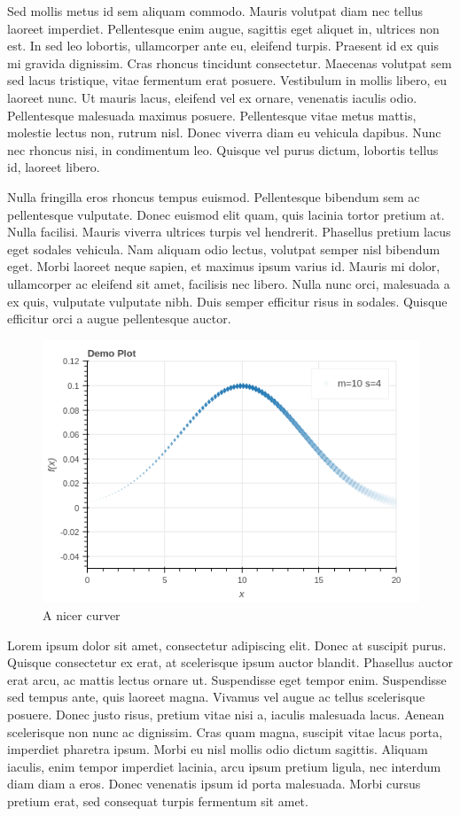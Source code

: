 \documentclass[11pt]{article}
\makeatletter
\def\maxwidth{\ifdim\Gin@nat@width>\linewidth\linewidth
    \else\Gin@nat@width\fi}
\let\Oldincludegraphics\includegraphics
\renewcommand{\includegraphics}[1]{\Oldincludegraphics[width=.8\maxwidth]{#1}}
\makeatother
\begin{document}
Sed mollis metus id sem aliquam commodo. Mauris volutpat diam nec tellus
laoreet imperdiet. Pellentesque enim augue, sagittis eget aliquet in,
ultrices non est. In sed leo lobortis, ullamcorper ante eu, eleifend
turpis. Praesent id ex quis mi gravida dignissim. Cras rhoncus tincidunt
consectetur. Maecenas volutpat sem sed lacus tristique, vitae fermentum
erat posuere. Vestibulum in mollis libero, eu laoreet nunc. Ut mauris
lacus, eleifend vel ex ornare, venenatis iaculis odio. Pellentesque
malesuada maximus posuere. Pellentesque vitae metus mattis, molestie
lectus non, rutrum nisl. Donec viverra diam eu vehicula dapibus. Nunc
nec rhoncus nisi, in condimentum leo. Quisque vel purus dictum, lobortis
tellus id, laoreet libero.

Nulla fringilla eros rhoncus tempus euismod. Pellentesque bibendum sem
ac pellentesque vulputate. Donec euismod elit quam, quis lacinia tortor
pretium at. Nulla facilisi. Mauris viverra ultrices turpis vel
hendrerit. Phasellus pretium lacus eget sodales vehicula. Nam aliquam
odio lectus, volutpat semper nisl bibendum eget. Morbi laoreet neque
sapien, et maximus ipsum varius id. Mauris mi dolor, ullamcorper ac
eleifend sit amet, facilisis nec libero. Nulla nunc orci, malesuada a ex
quis, vulputate vulputate nibh. Duis semper efficitur risus in sodales.
Quisque efficitur orci a augue pellentesque auctor.
       
    \begin{figure}[h!]
      \centering
      \includegraphics{img/nicer.png}
      \caption{A nicer curver}
      \label{fig:nicer}
	\end{figure}

    Lorem ipsum dolor sit amet, consectetur adipiscing elit. Donec at
suscipit purus. Quisque consectetur ex erat, at scelerisque ipsum auctor
blandit. Phasellus auctor erat arcu, ac mattis lectus ornare ut.
Suspendisse eget tempor enim. Suspendisse sed tempus ante, quis laoreet
magna. Vivamus vel augue ac tellus scelerisque posuere. Donec justo
risus, pretium vitae nisi a, iaculis malesuada lacus. Aenean scelerisque
non nunc ac dignissim. Cras quam magna, suscipit vitae lacus porta,
imperdiet pharetra ipsum. Morbi eu nisl mollis odio dictum sagittis.
Aliquam iaculis, enim tempor imperdiet lacinia, arcu ipsum pretium
ligula, nec interdum diam diam a eros. Donec venenatis ipsum id porta
malesuada. Morbi cursus pretium erat, sed consequat turpis fermentum sit
amet.
\end{document}
